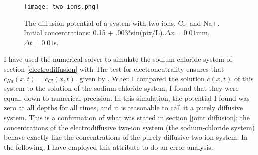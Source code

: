 \documentclass{article}
\begin{document}
\begin{figure}
  \texttt{[image: two\_ions.png]}
  \caption{The diffusion potential of a system with two ions, Cl- and Na+. Initial concentrations: 0.15 + .003*sin(pix/L).$\Delta x = 0.01$mm, $\Delta t = 0.01 $s. }
  \label{fig:two_ions}
\end{figure}

I have used the numerical solver to simulate the sodium-chloride system of section \ref{electrodiffusion} with  The test for electroneutrality ensures that $c_{Na}(x,t)=c_{Cl}(x,t)$.
given by .
 When I compared the solution $c(x,t)$ of this system to the solution of the sodium-chloride system, I found that they were equal, down to numerical precision. In this simulation, the potential I found was zero at all depths for all times, and it is reasonable to call it a purely diffusive system. This is a confirmation of what was stated in section \ref{joint diffusion}: the concentrations of the electrodiffusive two-ion system (the sodium-chloride system) behave exactly like the concentrations of the purely diffusive two-ion system. In the following, I have employed this attribute to do an error analysis. 
\end{document}
